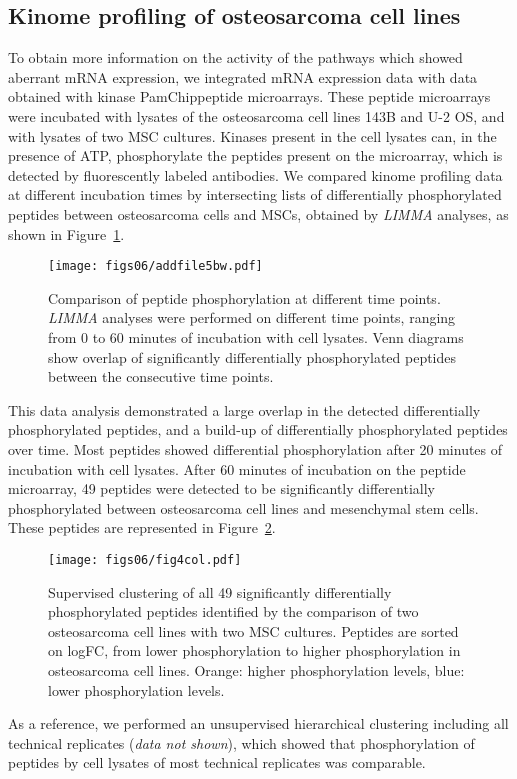 \subsection{Kinome profiling of osteosarcoma cell lines}
To obtain more information on the activity of the pathways which showed aberrant mRNA expression, we integrated mRNA expression data with data obtained with kinase PamChip\textregistered peptide microarrays. These peptide microarrays were incubated with lysates of the osteosarcoma cell lines 143B and U-2 OS, and with lysates of two MSC cultures. Kinases present in the cell lysates can, in the presence of ATP, phosphorylate the peptides present on the microarray, which is detected by fluorescently labeled antibodies. We compared kinome profiling data at different incubation times by intersecting lists of differentially phosphorylated peptides between osteosarcoma cells and MSCs, obtained by {\it LIMMA} analyses, as shown in Figure~\ref{afig6.5}.
%
\begin{figure}[htbp]
  \centering
  \begin{minipage}[b]{0.50\linewidth}
    \texttt{[image: figs06/addfile5bw.pdf]}		%
  \end{minipage}
    \hfill
  \begin{minipage}[b]{0.46\linewidth}
     \caption{Comparison of peptide phosphorylation at different time points. {\it LIMMA} analyses were performed on different time points, ranging from 0 to 60 minutes of incubation with cell lysates. Venn diagrams show overlap of significantly differentially phosphorylated peptides between the consecutive time points.}
     \label{afig6.5}
     \end{minipage}
\end{figure}
%
This data analysis demonstrated a large overlap in the detected differentially phosphorylated peptides, and a build-up of differentially phosphorylated peptides over time. Most peptides showed differential phosphorylation after 20 minutes of incubation with cell lysates. After 60 minutes of incubation on the peptide microarray, 49 peptides were detected to be significantly differentially phosphorylated between osteosarcoma cell lines and mesenchymal stem cells. These peptides are represented in Figure~\ref{fig6.4}.
%
\begin{figure}[htbp]
	\centering
	\texttt{[image: figs06/fig4col.pdf]}	%
	\caption{Supervised clustering of all 49 significantly differentially phosphorylated peptides identified by the comparison of two osteosarcoma cell lines with two MSC cultures. Peptides are sorted on logFC, from lower phosphorylation to higher phosphorylation in osteosarcoma cell lines. Orange: higher phosphorylation levels, blue: lower phosphorylation levels.}
	\label{fig6.4}
\end{figure}
%
As a reference, we performed an unsupervised hierarchical clustering including all technical replicates ({\it data not shown}), which showed that phosphorylation of peptides by cell lysates of most technical replicates was comparable.

